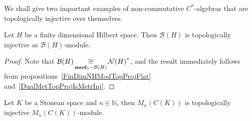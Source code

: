 We shall give two important examples of non-commutative $C^*$-algebras that are
topologically injective over themselves.

\begin{proposition}\label{FinDimBHModTopInj} Let $H$ be a finite dimensional
Hilbert space. Then $\mathcal{B}(H)$ is topologically injective as
$\mathcal{B}(H)$-module. 
\end{proposition}
\begin{proof} Note that
$\mathcal{B}(H)\mathop{\mathbin{\cong}}\limits_{\mathbf{mod}_1-\mathcal{B}(H)}{\mathcal{N}(H)}^*$, and
the result immediately follows from propositions~\ref{FinDimNHModTopProjFlat}
and~\ref{DualMetTopProjIsMetrInj}.
\end{proof}

\begin{proposition}\label{CKMatrixModTopInj} Let $K$ be a Stonean space and
$n\in\mathbb{N}$, then $M_n(C(K))$ is topologically injective
$M_n(C(K))$-module.
\end{proposition}
